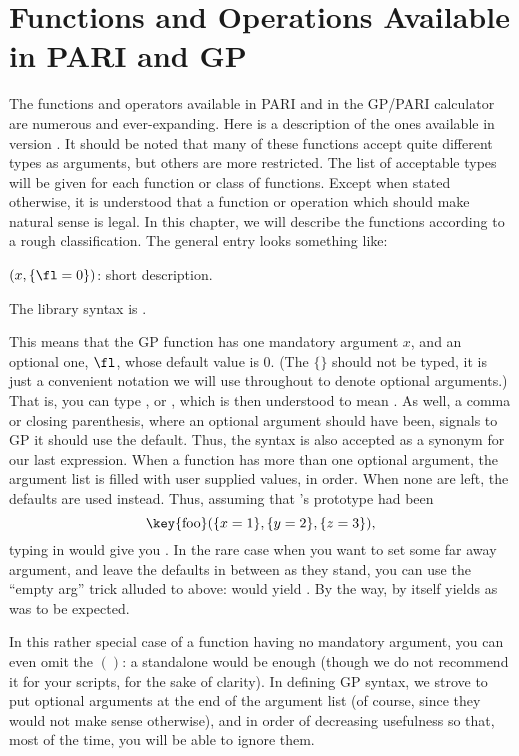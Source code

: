 %
%
\chapter{Functions and Operations Available in PARI and GP}
\label{se:functions}

The functions and operators available in PARI and in the GP/PARI calculator
are numerous and ever-expanding. Here is a description of the ones available
in version \vers. It should be noted that many of these functions accept
quite different types as arguments, but others are more restricted. The list
of acceptable types will be given for each function or class of functions.
Except when stated otherwise, it is understood that a function or operation
which should make natural sense is legal. In this chapter, we will describe
the functions according to a rough classification. The general entry looks
something like:

$(x,\{\fl=0\})$: short description.

The library syntax is .

\noindent
This means that the GP function  has one mandatory argument $x$, and
an optional one, $\fl$, whose default value is 0. (The $\{\}$ should not be
typed, it is just a convenient notation we will use throughout to denote
optional arguments.) That is, you can type , or ,
which is then understood to mean . As well, a comma or closing
parenthesis, where an optional argument should have been, signals to GP it
should use the default. Thus, the syntax  is also accepted as a
synonym for our last expression. When a function has more than one optional
argument, the argument list is filled with user supplied values, in order.
When none are left, the defaults are used instead. Thus, assuming that
's prototype had been
$$\hbox{%
\key{foo}$(\{x=1\},\{y=2\},\{z=3\})$,%
}$$
typing in  would give
you . In the rare case when you want to set some far away
argument, and leave the defaults in between as they stand, you can use the
``empty arg'' trick alluded to above:  would yield
. By the way,  by itself yields
 as was to be expected.

In this rather special case of a function having no mandatory argument, you
can even omit the $()$: a standalone  would be enough (though we
do not recommend it for your scripts, for the sake of clarity). In defining
GP syntax, we strove to put optional arguments at the end of the argument
list (of course, since they would not make sense otherwise), and in order of
decreasing usefulness so that, most of the time, you will be able to ignore
them.

